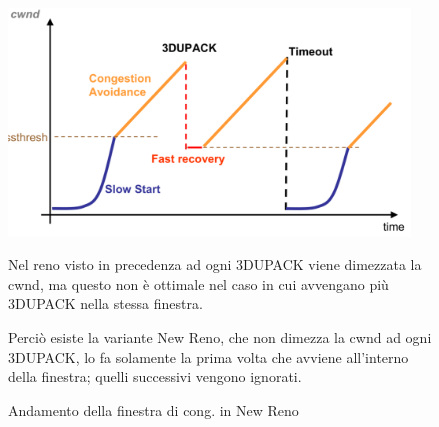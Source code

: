 \begin{figure}[h!]
    \begin{minipage}{0.6\textwidth}
        \centering
        \includegraphics[width=0.95\textwidth]{images/newreno.png}
        \caption{Andamento della finestra di cong. in New Reno}
        \label{fig:tcpnewreno}
    \end{minipage}
    \hfill
    \begin{minipage}{0.48\textwidth}
        Nel reno visto in precedenza ad ogni 3DUPACK viene dimezzata la cwnd, ma questo non è ottimale nel caso in cui avvengano più 3DUPACK nella stessa finestra.

        Perciò esiste la variante New Reno, che non dimezza la cwnd ad ogni 3DUPACK, lo fa solamente la prima volta che avviene all'interno della finestra; quelli successivi vengono ignorati.
    \end{minipage}
\end{figure}